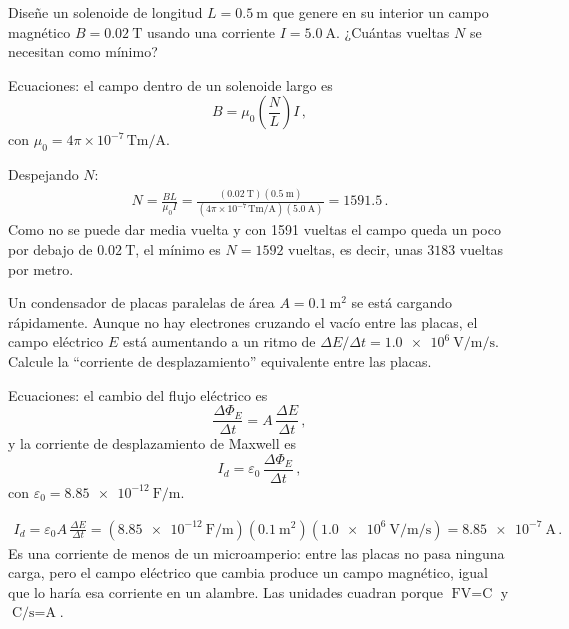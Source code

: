 \documentclass[12pt, a4paper]{article}
\begin{document}
\begin{exercise}[ID=solenoide, tags={parcial3}, points=25]
Diseñe un solenoide de longitud $L = \qty{0.5}{\meter}$ que genere en su interior un campo magnético $B = \qty{0.02}{\tesla}$ usando una corriente $I = \qty{5.0}{\ampere}$. ¿Cuántas vueltas $N$ se necesitan como mínimo?

Ecuaciones: el campo dentro de un solenoide largo es
\begin{equation}
    B = \mu_0 \left( \frac{N}{L} \right) I\,,
\end{equation}
con $\mu_0 = 4\pi\times 10^{-7}\,\unit{\tesla\meter\per\ampere}$.

\vspace{6cm}
\end{exercise}
\begin{solution}
Despejando $N$:
\begin{align}
    N = \frac{B L}{\mu_0 I} = \frac{(\qty{0.02}{\tesla})(\qty{0.5}{\meter})}{(4\pi\times 10^{-7}\,\unit{\tesla\meter\per\ampere})(\qty{5.0}{\ampere})} = 1591.5\,.
\end{align}
Como no se puede dar media vuelta y con 1591 vueltas el campo queda un poco por debajo de $\qty{0.02}{\tesla}$, el mínimo es $N = 1592$ vueltas, es decir, unas $3183$ vueltas por metro.
\end{solution}

\begin{exercise}[ID=desplazamiento, subtitle={El aporte de Maxwell (corriente de desplazamiento)}, tags={banco}]
Un condensador de placas paralelas de área $A = \qty{0.1}{\meter\squared}$ se está cargando rápidamente. Aunque no hay electrones cruzando el vacío entre las placas, el campo eléctrico $E$ está aumentando a un ritmo de $\Delta E/\Delta t = \qty{1.0e6}{\volt\per\meter\per\second}$. Calcule la ``corriente de desplazamiento'' equivalente entre las placas.

Ecuaciones: el cambio del flujo eléctrico es
\begin{equation}
    \frac{\Delta \Phi_E}{\Delta t} = A\, \frac{\Delta E}{\Delta t}\,,
\end{equation}
y la corriente de desplazamiento de Maxwell es
\begin{equation}
    I_d = \varepsilon_0\, \frac{\Delta \Phi_E}{\Delta t}\,,
\end{equation}
con $\varepsilon_0 = \qty{8.85e-12}{\farad\per\meter}$.

\vspace{6cm}
\end{exercise}
\begin{solution}
\begin{align}
    I_d = \varepsilon_0 A\, \frac{\Delta E}{\Delta t} = (\qty{8.85e-12}{\farad\per\meter})(\qty{0.1}{\meter\squared})(\qty{1.0e6}{\volt\per\meter\per\second}) = \qty{8.85e-7}{\ampere}\,.
\end{align}
Es una corriente de menos de un microamperio: entre las placas no pasa ninguna carga, pero el campo eléctrico que cambia produce un campo magnético, igual que lo haría esa corriente en un alambre. Las unidades cuadran porque $\unit{\farad\volt} = \unit{\coulomb}$ y $\unit{\coulomb\per\second} = \unit{\ampere}$.
\end{solution}
\end{document}
